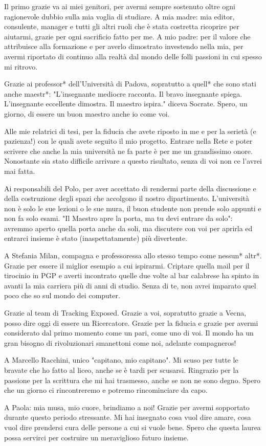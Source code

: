 
Il primo grazie va ai miei genitori, per avermi sempre sostenuto oltre ogni ragionevole dubbio sulla mia voglia di studiare. A mia madre: mia editor, consulente, manager e tutti gli altri ruoli che è stata costretta ricoprire per aiutarmi, grazie per ogni sacrificio fatto per me. A mio padre: per il valore che attribuisce alla formazione e per averlo dimostrato investendo nella mia, per avermi riportato di continuo alla realtà dal mondo delle folli passioni in cui spesso mi ritrovo. 

Grazie ai professor* dell'Università di Padova, sopratutto a quell* che sono stati anche maestr*: 
"L’insegnante mediocre racconta. Il bravo insegnante spiega. L’insegnante eccellente dimostra. Il maestro ispira." diceva Socrate. Spero, un giorno, di essere un buon maestro anche io come voi.

Alle mie relatrici di tesi, per la fiducia che avete riposto in me e per la serietà (e pazienza!) con le quali avete seguito il mio progetto. Entrare nella Rete e poter scrivere che anche la mia università ne fa parte è per me un grandissimo onore. Nonostante sia stato difficile arrivare a questo risultato, senza di voi non ce l'avrei mai fatta.

Ai responsabili del Polo, per aver accettato di rendermi parte della discussione e della costruzione degli spazi che accolgono il nostro dipartimento. L'università non è solo le sue lezioni o le sue mura, il buon studente non prende solo appunti e non fa solo esami. "Il Maestro apre la porta, ma tu devi entrare da solo": avremmo aperto quella porta anche da soli, ma discutere con voi per aprirla ed entrarci insieme è stato (inaspettatamente) più divertente.

A Stefania Milan, compagna e professoressa allo stesso tempo come nessun* altr*. Grazie per essere il miglior esempio a cui ispirarmi. Criptare quella mail per il tirocinio in PGP e averti incontrato quelle due volte al bar calabrese ha spinto in avanti la mia carriera più di anni di studio. Senza di te, non avrei imparato quel poco che so sul mondo dei computer.

Grazie al team di Tracking Exposed. Grazie a voi, sopratutto grazie a Vecna, posso dire oggi di essere un Ricercatore. Grazie per la fiducia e grazie per avermi considerato dal primo momento come un pari, come uno di voi. Il mondo ha un gran bisogno di rivoluzionari smanettoni come noi, adelante compagneros!

A Marcello Racchini, unico "capitano, mio capitano". Mi scuso per tutte le bravate che ho fatto al liceo, anche se è tardi per scusarsi. Ringrazio per la passione per la scrittura che mi hai trasmesso, anche se non ne sono degno. Spero che un giorno ci rincontreremo e potremo rincominciare da capo.

A Paola: mia musa, mio cuore, brindiamo a noi! Grazie per avermi sopportato durante questo periodo stressante. Mi hai insegnato cosa vuol dire amare, cosa vuol dire prendersi cura delle persone a cui si vuole bene. Spero che questa laurea possa servirci per costruire un meraviglioso futuro insieme.